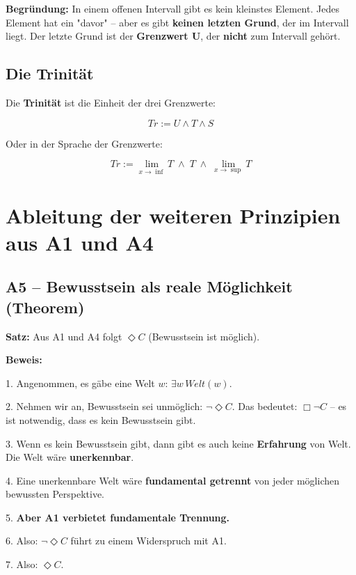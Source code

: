 \documentclass[
]{article}
\begin{document}
\textbf{Begründung:} In einem offenen Intervall gibt es kein kleinstes Element. Jedes Element hat ein "davor" – aber es gibt \textbf{keinen letzten Grund}, der im Intervall liegt. Der letzte Grund ist der \textbf{Grenzwert U}, der \textbf{nicht} zum Intervall gehört.

\subsection{Die Trinität}\label{die-trinituxe4t}

Die \textbf{Trinität} ist die Einheit der drei Grenzwerte:

\[
\boxed{Tr := U \land T \land S}
\]

Oder in der Sprache der Grenzwerte:

\[
\boxed{Tr := \lim_{x \to \inf} T \;\land\; T \;\land\; \lim_{x \to \sup} T}
\]

\section{Ableitung der weiteren Prinzipien aus A1 und A4}\label{ableitung-der-weiteren-prinzipien-aus-a1-und-a4}

\subsection{A5 – Bewusstsein als reale Möglichkeit (Theorem)}\label{a5-bewusstsein-als-reale-moumlglichkeit-theorem}

\textbf{Satz:} Aus A1 und A4 folgt \(\Diamond C\) (Bewusstsein ist möglich).

\textbf{Beweis:}

1. Angenommen, es gäbe eine Welt \(w\): \(\exists w\, Welt(w)\).

2. Nehmen wir an, Bewusstsein sei unmöglich: \(\neg\Diamond C\). Das bedeutet: \(\Box\neg C\) – es ist notwendig, dass es kein Bewusstsein gibt.

3. Wenn es kein Bewusstsein gibt, dann gibt es auch keine \textbf{Erfahrung} von Welt. Die Welt wäre \textbf{unerkennbar}.

4. Eine unerkennbare Welt wäre \textbf{fundamental getrennt} von jeder möglichen bewussten Perspektive.

5. \textbf{Aber A1 verbietet fundamentale Trennung.}

6. Also: \(\neg\Diamond C\) führt zu einem Widerspruch mit A1.

7. Also: \(\Diamond C\).
\end{document}
